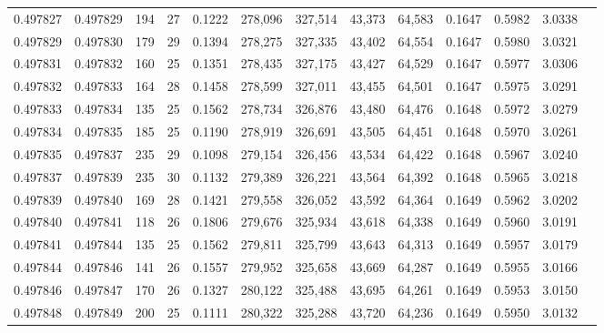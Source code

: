 \begin{tabular}{rrrrrrrrrrrrr}
0.497827 & 0.497829 & 194 &  27 &                                     0.1222 & 278,096 & 327,514 &  43,373 &  64,583 & 0.1647 & 0.5982 & 3.0338 \\
0.497829 & 0.497830 & 179 &  29 &                                     0.1394 & 278,275 & 327,335 &  43,402 &  64,554 & 0.1647 & 0.5980 & 3.0321 \\
0.497831 & 0.497832 & 160 &  25 &                                     0.1351 & 278,435 & 327,175 &  43,427 &  64,529 & 0.1647 & 0.5977 & 3.0306 \\
0.497832 & 0.497833 & 164 &  28 &                                     0.1458 & 278,599 & 327,011 &  43,455 &  64,501 & 0.1647 & 0.5975 & 3.0291 \\
0.497833 & 0.497834 & 135 &  25 &                                     0.1562 & 278,734 & 326,876 &  43,480 &  64,476 & 0.1648 & 0.5972 & 3.0279 \\
0.497834 & 0.497835 & 185 &  25 &                                     0.1190 & 278,919 & 326,691 &  43,505 &  64,451 & 0.1648 & 0.5970 & 3.0261 \\
0.497835 & 0.497837 & 235 &  29 &                                     0.1098 & 279,154 & 326,456 &  43,534 &  64,422 & 0.1648 & 0.5967 & 3.0240 \\
0.497837 & 0.497839 & 235 &  30 &                                     0.1132 & 279,389 & 326,221 &  43,564 &  64,392 & 0.1648 & 0.5965 & 3.0218 \\
0.497839 & 0.497840 & 169 &  28 &                                     0.1421 & 279,558 & 326,052 &  43,592 &  64,364 & 0.1649 & 0.5962 & 3.0202 \\
0.497840 & 0.497841 & 118 &  26 &                                     0.1806 & 279,676 & 325,934 &  43,618 &  64,338 & 0.1649 & 0.5960 & 3.0191 \\
0.497841 & 0.497844 & 135 &  25 &                                     0.1562 & 279,811 & 325,799 &  43,643 &  64,313 & 0.1649 & 0.5957 & 3.0179 \\
0.497844 & 0.497846 & 141 &  26 &                                     0.1557 & 279,952 & 325,658 &  43,669 &  64,287 & 0.1649 & 0.5955 & 3.0166 \\
0.497846 & 0.497847 & 170 &  26 &                                     0.1327 & 280,122 & 325,488 &  43,695 &  64,261 & 0.1649 & 0.5953 & 3.0150 \\
0.497848 & 0.497849 & 200 &  25 &                                     0.1111 & 280,322 & 325,288 &  43,720 &  64,236 & 0.1649 & 0.5950 & 3.0132 \\

\end{tabular}
